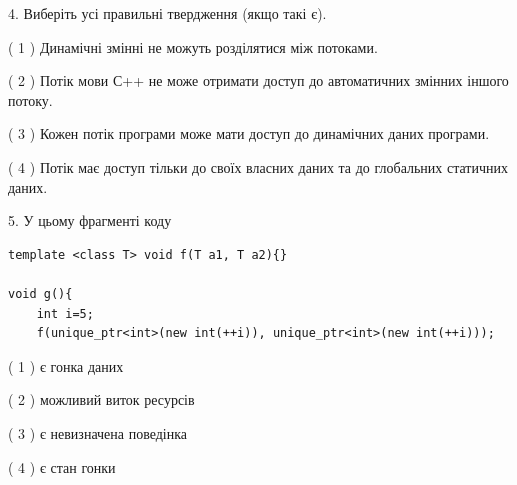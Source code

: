 \documentclass[12pt, ukrainian]{article}
\begin{document}
\begin {large}
{%
4. Виберіть усі правильні твердження (якщо такі є).\par
\vspace{2mm}

( 1 ) Динамічні змінні не можуть розділятися між потоками.%

( 2 ) Потік мови С++ не може отримати доступ до автоматичних змінних іншого потоку.%

( 3 ) Кожен потік програми може мати доступ до динамічних даних програми.%

( 4 ) Потік має доступ тільки до своїх власних даних та до глобальних статичних даних.%


5. У цьому фрагменті коду
\begin{verbatim}
template <class T> void f(T a1, T a2){}

void g(){
    int i=5;
    f(unique_ptr<int>(new int(++i)), unique_ptr<int>(new int(++i)));
\end{verbatim}

( 1 ) є гонка даних%

( 2 ) можливий виток ресурсів%

( 3 ) є невизначена поведінка%

( 4 ) є стан гонки%
}
\end {large}
\end{document}
